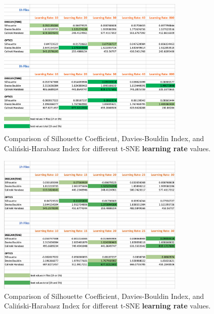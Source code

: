 \begin{figure}
  \centering
  \includegraphics[width=0.8\textwidth]{./images/tsneParametersTest/learningRate/learningRateEvaluationScoresDetailed2.png}
  \caption{Comparison of Silhouette Coefficient, Davies-Bouldin Index, and Caliński-Harabasz Index for different t-SNE \textbf{learning rate} values.}
  \label{figure:learningRateEvaluationScoresDetailed2}
\end{figure}

\begin{figure}
  \centering
  \includegraphics[width=0.8\textwidth]{./images/tsneParametersTest/learningRate/learningRateEvaluationScoresDetailed3.png}
  \caption{Comparison of Silhouette Coefficient, Davies-Bouldin Index, and Caliński-Harabasz Index for different t-SNE \textbf{learning rate} values.}
  \label{figure:learningRateEvaluationScoresDetailed3}
\end{figure}





\clearpage
